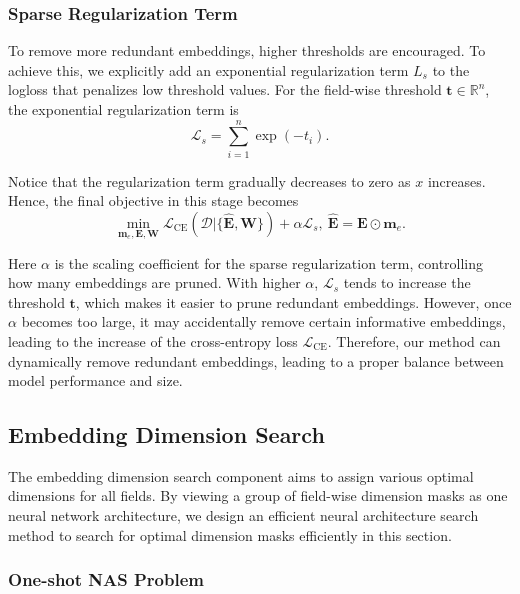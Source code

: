 \documentclass[sigconf]{acmart}
\begin{document}
\subsubsection{Sparse Regularization Term}

To remove more redundant embeddings, higher thresholds are encouraged. To achieve this, we explicitly add an exponential regularization term $L_s$ to the logloss that penalizes low threshold values. For the field-wise threshold $\mathbf{t} \in \mathbb{R}^{n}$, the exponential regularization term is 
\begin{equation}
    \mathcal{L}_s = \sum_{i=1}^n \exp(-t_i).
\end{equation}

Notice that the regularization term gradually decreases to zero as $x$ increases. Hence, the final objective in this stage becomes 
\begin{equation}
\label{eq:loss_feature}
    \min_{\mathbf{m}_e, \mathbf{E}, \mathbf{W}} \mathcal{L}_{\text{CE}}(\mathcal{D}|\{\hat{\mathbf{E}}, \mathbf{W}\}) + \alpha \mathcal{L}_s, \ \hat{\mathbf{E}} = \mathbf{E} \odot \mathbf{m}_e.
\end{equation}

Here $\alpha$ is the scaling coefficient for the sparse regularization term, controlling how many embeddings are pruned. With higher $\alpha$, $\mathcal{L}_s$ tends to increase the threshold $\mathbf{t}$, which makes it easier to prune redundant embeddings. However, once $\alpha$ becomes too large, it may accidentally remove certain informative embeddings, leading to the increase of the cross-entropy loss $\mathcal{L}_{\text{CE}}$. Therefore, our method can dynamically remove redundant embeddings, leading to a proper balance between model performance and size. 

\subsection{Embedding Dimension Search}
\label{sec:embed_mask}


The embedding dimension search component aims to assign various optimal dimensions for all fields. By viewing a group of field-wise dimension masks as one neural network architecture, we design an efficient neural architecture search method to search for optimal dimension masks efficiently in this section.


\subsubsection{One-shot NAS Problem}
\end{document}
